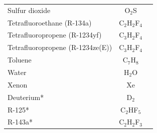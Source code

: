 \begin{longtable}{|lcc|}
Sulfur dioxide & O$_2$S & \cite{lemmon:2006}\\
Tetrafluoroethane (R-134a) & C$_2$H$_2$F$_4$ & \cite{tilner:1994}\\
Tetrafluoropropene (R-1234yf) & C$_3$H$_2$F$_4$ & \cite{lemmon:2022}\\
Tetrafluoropropene (R-1234ze(E)) & C$_3$H$_2$F$_4$ & \cite{thol:2016}\\
Toluene & C$_7$H$_8$ & \cite{lemmon:2006}\\
Water & H$_2$O & \cite{iapws:2014}\\
Xenon & Xe & \cite{lemmon:2006}\\
\hline
Deuterium* & D$_2$ & \cite{richardson:2014}\\
R-125* & C$_2$HF$_5$ & \cite{piao:1998}\\
R-143a* & C$_2$H$_2$F$_3$ & \cite{lemmon:2000}\\
\end{longtable}

